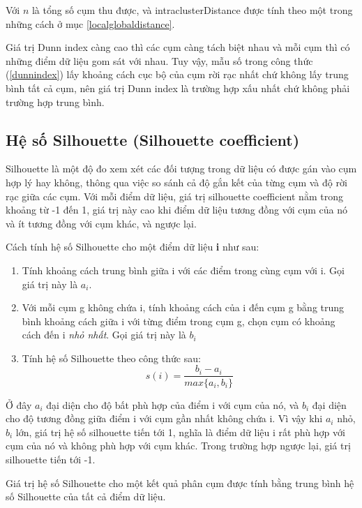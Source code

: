 		Với $n$ là tổng số cụm thu được, và intraclusterDistance được tính theo một trong những cách ở mục \ref{localglobaldistance}.
		
	Giá trị Dunn index càng cao thì các cụm càng tách biệt nhau và mỗi cụm thì có những điểm dữ liệu gom sát với nhau. Tuy vậy, mẫu số trong công thức (\ref{dunnindex}) lấy khoảng cách cục bộ của cụm rời rạc nhất chứ không lấy trung bình tất cả cụm, nên giá trị Dunn index là trường hợp xấu nhất chứ không phải trường hợp trung bình.
	\subsection{Hệ số Silhouette (Silhouette coefficient)}
	
	Silhouette là một độ đo xem xét các đối tượng trong dữ liệu có được gán vào cụm hợp lý hay không, thông qua việc so sánh cả độ gắn kết của từng cụm và độ rời rạc giữa các cụm. Với mỗi điểm dữ liệu, giá trị silhouette coefficient nằm trong khoảng từ -1 đến 1, giá trị này cao khi điểm dữ liệu tương đồng với cụm của nó và ít tương đồng với cụm khác, và ngược lại. 
	
	Cách tính hệ số Silhouette cho một điểm dữ liệu \textbf{i} như sau:
	\begin{enumerate}
		\item Tính khoảng cách trung bình giữa i với các điểm trong cùng cụm với i. Gọi giá trị này là $a_i$.
		\item Với mỗi cụm g không chứa i, tính khoảng cách của i đến cụm g bằng trung bình khoảng cách giữa i với từng điểm trong cụm g, chọn cụm có khoảng cách đến i \textit{nhỏ nhất}. Gọi giá trị này là $b_i$
		\item Tính hệ số Silhouette theo công thức sau:
		\begin{equation}
		s(i) = \frac{b_i - a_i}{max\{a_i,b_i\}}
		\end{equation}
	\end{enumerate}
	
	Ở đây $a_i$ đại diện cho độ bất phù hợp của điểm i với cụm của nó, và $b_i$ đại diện cho độ tương đồng giữa điểm i với cụm gần nhất không chứa i. Vì vậy khi $a_i$ nhỏ, $b_i$ lớn, giá trị hệ số silhouette tiến tới 1, nghĩa là điểm dữ liệu i rất phù hợp với cụm của nó và không phù hợp với cụm khác. Trong trường hợp ngược lại, giá trị silhouette tiến tới -1.
	
	Giá trị hệ số Silhouette cho một kết quả phân cụm được tính bằng trung bình hệ số Silhouette của tất cả điểm dữ liệu.

